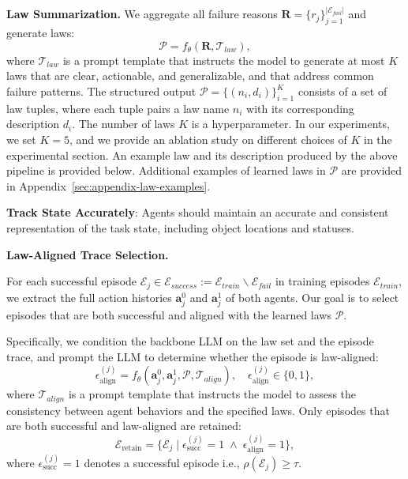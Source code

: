 \documentclass{article}
\theoremstyle{plain}
\theoremstyle{definition}
\theoremstyle{remark}
\begin{document}
\textbf{Law Summarization.} We aggregate all failure reasons $\mathbf{R} = \{r_j\}_{j=1}^{|\mathcal{E}_{fail}|}$ and generate laws:
\begin{equation}
\mathcal{P} = f_\theta(\mathbf{R}, \mathcal{T}_{law}),
\end{equation}
where $\mathcal{T}_{law}$ is a prompt template that instructs the model to generate at most $K$ laws that are clear, actionable, and generalizable, and that address common failure patterns. The structured output $\mathcal{P} = \{(n_i, d_i)\}_{i=1}^K$ consists of a set of law tuples, where each tuple pairs a law name $n_i$ with its corresponding description $d_i$. 
The number of laws $K$ is a hyperparameter. In our experiments, we set $K = 5$, and we provide an ablation study on different choices of $K$ in the experimental section. An example law and its description produced by the above pipeline is provided below. Additional examples of learned laws in $\mathcal{P}$ are provided in Appendix~\ref{sec:appendix-law-examples}.
\begin{mdframed}[linewidth=0.8pt, roundcorner=4pt, innerleftmargin=6pt, innerrightmargin=6pt, innertopmargin=6pt, innerbottommargin=6pt]
\textbf{Track State Accurately}: Agents should maintain an accurate and consistent representation of the task state, including object locations and statuses.
\end{mdframed}


\textbf{Law-Aligned Trace Selection.} 

For each successful episode $\mathcal{E}_j \in \mathcal{E}_{success}:=\mathcal{E}_{train}\backslash\mathcal{E}_{fail}$ in training episodes $\mathcal{E}_{train}$, we extract the full action histories $\mathbf{a}_j^0$ and $\mathbf{a}_j^1$ of both agents. Our goal is to select episodes that are both successful and aligned with the learned laws $\mathcal{P}$.

Specifically, we condition the backbone LLM on the law set and the episode trace, and prompt the LLM to determine whether the episode is law-aligned:
\begin{equation}
\epsilon_{\text{align}}^{(j)} 
= f_\theta(\mathbf{a}_j^0, \mathbf{a}_j^1, \mathcal{P}, \mathcal{T}_{align}),
\quad \epsilon_{\text{align}}^{(j)} \in \{0,1\},
\end{equation}
where $\mathcal{T}_{align}$ is a prompt template that instructs the model to assess the consistency between agent behaviors and the specified laws.
Only episodes that are both successful and law-aligned are retained:
\begin{equation}
\mathcal{E}_{\text{retain}} 
= \{ \mathcal{E}_j \mid \epsilon_{\text{succ}}^{(j)} = 1 \;\wedge\; \epsilon_{\text{align}}^{(j)} = 1 \},
\end{equation}
where $\epsilon_{\text{succ}}^{(j)} = 1$ denotes a successful episode i.e., $\rho(\mathcal{E}_j)\!\!\geq\!\!\tau$.
\end{document}
